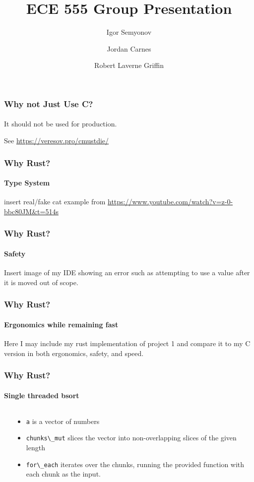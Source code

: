 \documentclass[aspectratio=169]{beamer}
\title[Short Title]{
    ECE 555 Group Presentation
}
\author{
	Igor Semyonov
	\and Jordan Carnes
	\and Robert Laverne Griffin
}
\institute{
    George Macon University, Department of Electrical and Computer Engineering
}
\begin{document}
\begin{frame}
	\vspace{-1.8cm}
	\titlepage
\end{frame}

\begin{frame}
	\frametitle{Why not Just Use C?}
	\framesubtitle{}

	It should not be used for production.

	See \url{https://veresov.pro/cmustdie/}
\end{frame}

\begin{frame}
	\frametitle{Why Rust?}
	\framesubtitle{Type System}

	insert real/fake cat example from \url{https://www.youtube.com/watch?v=z-0-bbc80JM&t=514s}
\end{frame}

\begin{frame}
	\frametitle{Why Rust?}
	\framesubtitle{Safety}

	Insert image of my IDE showing an error such as attempting to use a value after it is moved out of scope.
\end{frame}

\begin{frame}
	\frametitle{Why Rust?}
	\framesubtitle{Ergonomics while remaining fast}

	Here I may include my rust implementation of project 1 and compare it to my C version in both ergonomics, safety, and speed.
\end{frame}

\begin{frame}
	\frametitle{Why Rust?}
	\framesubtitle{Single threaded bsort}
	\begin{columns}
        \begin{column}{ 0.5\textwidth }
            
        \end{column}
		\begin{column}{ 0.4\textwidth }
            \begin{itemize}
                \item \Verb|a| is a vector of numbers
                \item \Verb|chunks\_mut| slices the vector into non-overlapping slices of the given length
                \item \Verb|for\_each| iterates over the chunks, running the provided function with each chunk as the input.
            \end{itemize}
		\end{column}
	\end{columns}
\end{frame}
\end{document}
